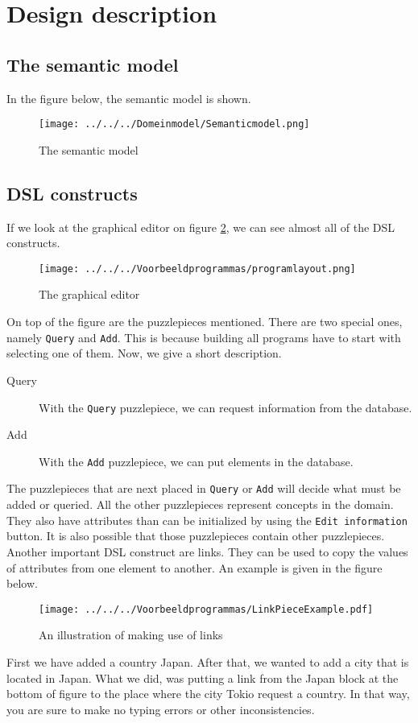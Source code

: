 \section{Design description}
\subsection{The semantic model}
In the figure below, the semantic model is shown.
\begin{figure}[H]
	\centering
	\texttt{[image: ../../../Domeinmodel/Semanticmodel.png]}
	\caption{The semantic model}
	\label{Semanticmodel}
\end{figure}
\subsection{DSL constructs}
If we look at the graphical editor on figure \ref{fig:DSLlayoutinconstructs}, we can see almost all of the DSL constructs.
\begin{figure}[H]
	\centering
	\texttt{[image: ../../../Voorbeeldprogrammas/programlayout.png]}
	\caption{The graphical editor}
	\label{fig:DSLlayoutinconstructs}
\end{figure}
\noindent On top of the figure are the puzzlepieces mentioned. There are two special ones, namely \texttt{Query} and \texttt{Add}. This is because building all programs have to start with selecting one of them.  Now, we give a short description.
\begin{description}
 \item[Query] With the \texttt{Query} puzzlepiece, we can request information from the database.
 \item[Add] With the \texttt{Add} puzzlepiece, we can put elements in the database.  
\end{description}
The puzzlepieces that are next placed in \texttt{Query} or \texttt{Add} will decide what must be added or queried.
All the other puzzlepieces represent concepts in the domain. They also have attributes than can be initialized by using the \texttt{Edit information} button. It is also possible that those puzzlepieces contain other puzzlepieces. 
Another important DSL construct are links. They can be used to copy the values of attributes from one element to another. An example is given in the figure below.
\begin{figure}[H]
	\centering
	\texttt{[image: ../../../Voorbeeldprogrammas/LinkPieceExample.pdf]}
	\caption{An illustration of making use of links}
	\label{linkpieceexample}
\end{figure}
First we have added a country Japan. After that, we wanted to add a city that is located in Japan. What we did, was putting a link from the Japan block at the bottom of figure to the place where the city Tokio request a country. In that way, you are sure to make no typing errors or other inconsistencies.

